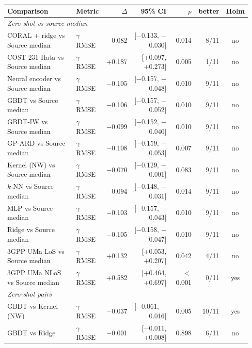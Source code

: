 \begin{tabular}{llrrrrc}
\toprule
Comparison & Metric & $\Delta$ & 95\% CI & $p$ & better & Holm \\
\midrule
\multicolumn{7}{l}{\emph{Zero-shot vs source median}} \\
CORAL + ridge vs Source median & $\gamma$ RMSE & \ensuremath{-}0.082 & [\ensuremath{-}0.133, \ensuremath{-}0.030] & 0.014 & 8/11 & no \\
COST-231 Hata vs Source median & $\gamma$ RMSE & +0.187 & [+0.097, +0.273] & 0.005 & 1/11 & no \\
Neural encoder vs Source median & $\gamma$ RMSE & \ensuremath{-}0.105 & [\ensuremath{-}0.157, \ensuremath{-}0.048] & 0.010 & 9/11 & no \\
GBDT vs Source median & $\gamma$ RMSE & \ensuremath{-}0.106 & [\ensuremath{-}0.157, \ensuremath{-}0.052] & 0.010 & 9/11 & no \\
GBDT-IW vs Source median & $\gamma$ RMSE & \ensuremath{-}0.099 & [\ensuremath{-}0.152, \ensuremath{-}0.040] & 0.010 & 9/11 & no \\
GP-ARD vs Source median & $\gamma$ RMSE & \ensuremath{-}0.108 & [\ensuremath{-}0.159, \ensuremath{-}0.053] & 0.007 & 9/11 & no \\
Kernel (NW) vs Source median & $\gamma$ RMSE & \ensuremath{-}0.070 & [\ensuremath{-}0.129, \ensuremath{-}0.001] & 0.083 & 9/11 & no \\
$k$-NN vs Source median & $\gamma$ RMSE & \ensuremath{-}0.094 & [\ensuremath{-}0.148, \ensuremath{-}0.031] & 0.014 & 9/11 & no \\
MLP vs Source median & $\gamma$ RMSE & \ensuremath{-}0.103 & [\ensuremath{-}0.157, \ensuremath{-}0.043] & 0.010 & 9/11 & no \\
Ridge vs Source median & $\gamma$ RMSE & \ensuremath{-}0.105 & [\ensuremath{-}0.158, \ensuremath{-}0.047] & 0.010 & 9/11 & no \\
3GPP UMa LoS vs Source median & $\gamma$ RMSE & +0.132 & [+0.053, +0.207] & 0.042 & 4/11 & no \\
3GPP UMa NLoS vs Source median & $\gamma$ RMSE & +0.582 & [+0.464, +0.697] & $<$0.001 & 0/11 & yes \\
\multicolumn{7}{l}{\emph{Zero-shot pairs}} \\
GBDT vs Kernel (NW) & $\gamma$ RMSE & \ensuremath{-}0.037 & [\ensuremath{-}0.061, \ensuremath{-}0.016] & 0.005 & 10/11 & yes \\
GBDT vs Ridge & $\gamma$ RMSE & \ensuremath{-}0.001 & [\ensuremath{-}0.011, +0.008] & 0.898 & 6/11 & no \\

\end{tabular}
